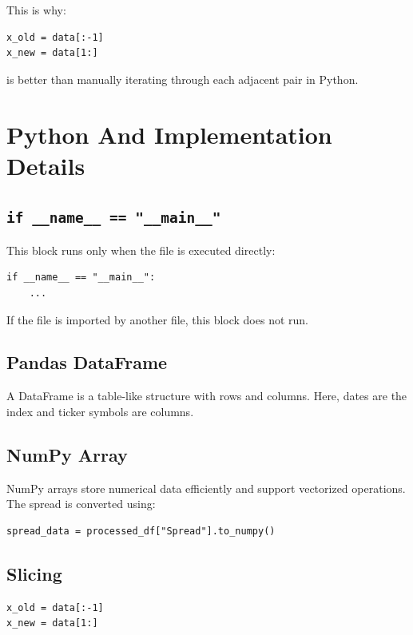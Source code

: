 \documentclass[11pt]{article}
\newcommand{\code}[1]{\texttt{#1}}
\begin{document}
This is why:

\begin{lstlisting}[style=pythonstyle]
x_old = data[:-1]
x_new = data[1:]
\end{lstlisting}

is better than manually iterating through each adjacent pair in Python.

\section{Python And Implementation Details}

\subsection{\code{if \_\_name\_\_ == "\_\_main\_\_"}}

This block runs only when the file is executed directly:

\begin{lstlisting}[style=pythonstyle]
if __name__ == "__main__":
    ...
\end{lstlisting}

If the file is imported by another file, this block does not run.

\subsection{Pandas DataFrame}

A DataFrame is a table-like structure with rows and columns. Here, dates are the
index and ticker symbols are columns.

\subsection{NumPy Array}

NumPy arrays store numerical data efficiently and support vectorized operations.
The spread is converted using:

\begin{lstlisting}[style=pythonstyle]
spread_data = processed_df["Spread"].to_numpy()
\end{lstlisting}

\subsection{Slicing}

\begin{lstlisting}[style=pythonstyle]
x_old = data[:-1]
x_new = data[1:]
\end{lstlisting}
\end{document}
